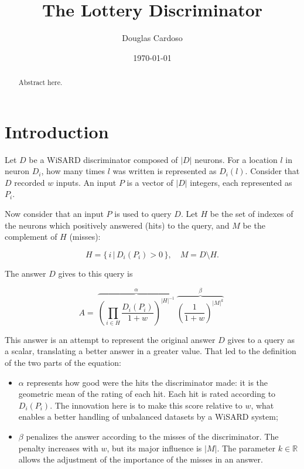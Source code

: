 \documentclass{article}
\begin{document}
   \title{The Lottery Discriminator}
   \author{Douglas Cardoso}
   \date{\today}
   \maketitle

   \begin{abstract}
      Abstract here.
   \end{abstract}

   \section{Introduction}

      Let $D$ be a WiSARD discriminator composed of $|D|$ neurons. For a
      location $l$ in neuron $D_i$, how many times $l$ was written is
      represented as $D_i(l)$.  Consider that $D$ recorded $w$ inputs. An input
      $P$ is a vector of $|D|$ integers, each represented as $P_i$.

      Now consider that an input $P$ is used to query $D$. Let $H$ be the set
      of indexes of the neurons which positively answered (hits) to the query,
      and $M$ be the complement of $H$ (misses):
      
      $$H = \{\, i \, | \, D_i(P_i) > 0 \, \}, \quad M = D \setminus H.$$

      The answer $D$ gives to this query is

      $$
      A = \
      \overbrace{
         \left( \prod_{i \in H} \frac{D_i(P_i)}{1 + w} \right)^{|H|^{-1}}
      }^\alpha \
      \overbrace{\left( \frac{1}{1 + w} \right)^{|M|^k}}^\beta \
      $$

      This answer is an attempt to represent the original answer $D$ gives to a
      query as a scalar, translating a better answer in a greater value. That
      led to the definition of the two parts of the equation:

      \begin{itemize}

         \item $\alpha$ represents how good were the hits the discriminator
            made: it is the geometric mean of the rating of each hit. Each hit
            is rated according to $D_i(P_i)$. The innovation here is to make
            this score relative to $w$, what enables a better handling of
            unbalanced datasets by a WiSARD system;

         \item $\beta$ penalizes the answer according to the misses of the
            discriminator. The penalty increases with $w$, but its major
            influence is $|M|$. The parameter $k \in \mathbb{R}$ allows the
            adjustment of the importance of the misses in an answer.

      \end{itemize}
\end{document}
